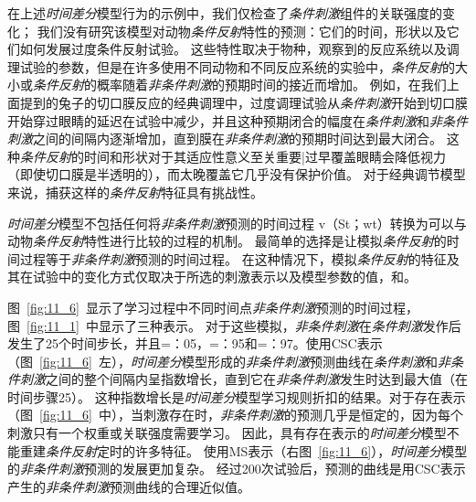 {在上述\textit{时间差分}模型行为的示例中，我们仅检查了\textit{条件刺激}组件的关联强度的变化；
我们没有研究该模型对动物\textit{条件反射}特性的预测：它们的时间，形状以及它们如何发展过度条件反射试验。
这些特性取决于物种，观察到的反应系统以及调理试验的参数，但是在许多使用不同动物和不同反应系统的实验中，\textit{条件反射}的大小或\textit{条件反射}的概率随着\textit{非条件刺激}的预期时间的接近而增加。
例如，在我们上面提到的兔子的切口膜反应的经典调理中，过度调理试验从\textit{条件刺激}开始到切口膜开始穿过眼睛的延迟在试验中减少，并且这种预期闭合的幅度在\textit{条件刺激}和\textit{非条件刺激}之间的间隔内逐渐增加，直到膜在\textit{非条件刺激}的预期时间达到最大闭合。
这种\textit{条件反射}的时间和形状对于其适应性意义至关重要|过早覆盖眼睛会降低视力（即使切口膜是半透明的），而太晚覆盖它几乎没有保护价值。
对于经典调节模型来说，捕获这样的\textit{条件反射}特征具有挑战性。


\textit{时间差分}模型不包括任何将\textit{非条件刺激}预测的时间过程 v（St；wt）转换为可以与动物\textit{条件反射}特性进行比较的过程的机制。
最简单的选择是让模拟\textit{条件反射}的时间过程等于\textit{非条件刺激}预测的时间过程。
在这种情况下，模拟\textit{条件反射}的特征及其在试验中的变化方式仅取决于所选的刺激表示以及模型参数的值，和。


图~\ref{fig:11_6}~显示了学习过程中不同时间点\textit{非条件刺激}预测的时间过程，图~\ref{fig:11_1}~中显示了三种表示。
对于这些模拟，\textit{非条件刺激}在\textit{条件刺激}发作后发生了25个时间步长，并且=：05，=：95和=：97。使用CSC表示（图~\ref{fig:11_6}~左），\textit{时间差分}模型形成的\textit{非条件刺激}预测曲线在\textit{条件刺激}和\textit{非条件刺激}之间的整个间隔内呈指数增长，直到它在\textit{非条件刺激}发生时达到最大值（在时间步骤25）。
这种指数增长是\textit{时间差分}模型学习规则折扣的结果。对于存在表示（图~\ref{fig:11_6}~中），当刺激存在时，\textit{非条件刺激}的预测几乎是恒定的，因为每个刺激只有一个权重或关联强度需要学习。
因此，具有存在表示的\textit{时间差分}模型不能重建\textit{条件反射}定时的许多特征。
使用MS表示（右图~\ref{fig:11_6}），\textit{时间差分}模型的\textit{非条件刺激}预测的发展更加复杂。
经过200次试验后，预测的曲线是用CSC表示产生的\textit{非条件刺激}预测曲线的合理近似值。


}
